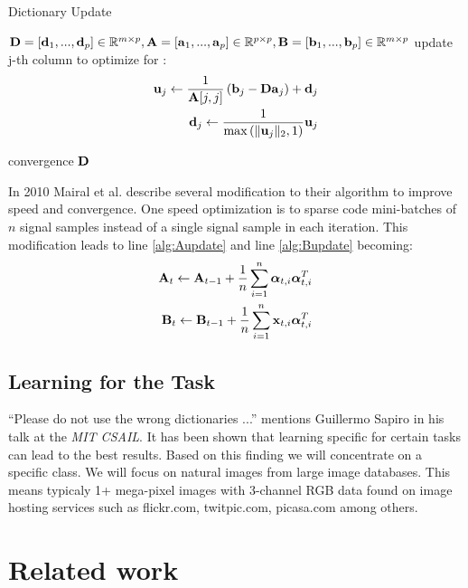 \begin{algorithm}[H]
\caption{Dictionary Update}
\label{alg:update}
\begin{algorithmic}[1]
\REQUIRE $\boldsymbol{\mathrm{D}}=[\boldsymbol{\mathrm{d}}_1,...,\boldsymbol{\mathrm{d}}_p] \in \mathbb{R}^{m \times p},
\boldsymbol{\mathrm{A}}=[\boldsymbol{\mathrm{a}}_1,...,\boldsymbol{\mathrm{a}}_p] \in \mathbb{R}^{p \times p},
\boldsymbol{\mathrm{B}}=[\boldsymbol{\mathrm{b}}_1,...,\boldsymbol{\mathrm{b}}_p] \in \mathbb{R}^{m \times p}$
\REPEAT
{}
\STATE update j-th column to optimize for :
\begin{align*}
\boldsymbol{\mathrm{u}}_j \gets
\frac{1}{\boldsymbol{\mathrm{A}}[j,j]}\left(\boldsymbol{\mathrm{b}}_j-\boldsymbol{\mathrm{D}}\boldsymbol{\mathrm{a}}_j\right)+\boldsymbol{\mathrm{d}}_j \\
\boldsymbol{\mathrm{d}}_j \gets \frac{1}{\max\left(\lVert \boldsymbol{\mathrm{u}}_j \rVert_2,1\right)} \boldsymbol{\mathrm{u}}_j
\end{align*}

\ENDFOR
\UNTIL convergence 
\RETURN $\boldsymbol{\mathrm{D}}$
\end{algorithmic}
\end{algorithm}
In 2010 Mairal et al. \cite{Mairal2010} describe several modification to
their algorithm to improve speed and convergence. One speed optimization is to
sparse code mini-batches of $n$ signal samples instead of a single signal sample
in each iteration. This modification leads to line \ref{alg:Aupdate} and line
\ref{alg:Bupdate}
becoming:
\begin{align*}
\boldsymbol{\mathrm{A}}_t \gets \boldsymbol{\mathrm{A}}_{t-1} +
\frac{1}{n}\sum_{i=1}^{n}\boldsymbol{\mathrm{\alpha}}_{t,i}\boldsymbol{\mathrm{\alpha}}_{t,i}^T\\
\boldsymbol{\mathrm{B}}_t \gets \boldsymbol{\mathrm{B}}_{t-1} +
\frac{1}{n}\sum_{i=1}^{n}\boldsymbol{\mathrm{x}}_{t,i}\boldsymbol{\mathrm{\alpha}}_{t,i}^T
\end{align*}





\subsection{Learning for the Task}
\label{sec:learnForTheTask}
``Please do not use the wrong dictionaries ...''
mentions Guillermo Sapiro in his talk at the \emph{MIT CSAIL}.
It has been shown that learning specific for certain tasks can lead to the
best results. Based on this finding we will concentrate on a
specific class. We will focus on natural images from large image databases.
This means typicaly 1+ mega-pixel images with 3-channel RGB data found on image
hosting services such as flickr.com, twitpic.com, picasa.com among others.


\section{Related work}
\label{sec:related_dictionarie}

